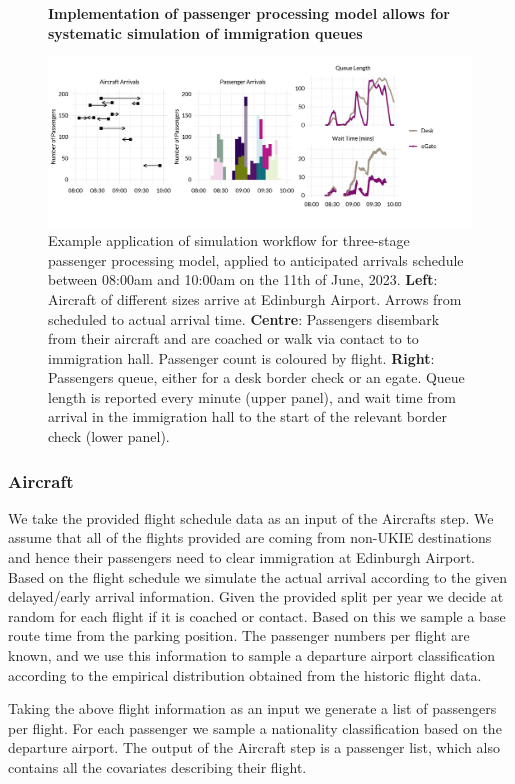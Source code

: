 \documentclass[10pt]{article}
\newcommand*{\figuretitle}[1]{%
    {\centering%
    \textbf{#1}%
    \par\medskip}%
}
\begin{document}
\begin{figure}[!ht]
    \centering
    \figuretitle{Implementation of passenger processing model allows for systematic simulation of immigration queues}
    \includegraphics[width=1.1\textwidth]{figures/workflow_fig.png}
     \caption{Example application of simulation workflow for three-stage passenger processing model, applied to anticipated arrivals schedule between 08:00am and 10:00am on the 11th of June, 2023. \textbf{Left}: Aircraft of different sizes arrive at Edinburgh Airport. Arrows from scheduled to actual arrival time. \textbf{Centre}: Passengers disembark from their aircraft and are coached or walk via contact to to immigration hall. Passenger count is coloured by flight. \textbf{Right}: Passengers queue, either for a desk border check or an \gls{egate}. Queue length is reported every minute (upper panel), and wait time from arrival in the immigration hall to the start of the relevant border check (lower panel).} \label{fig:workflow_fig}
\end{figure}


\subsubsection{Aircraft}
We take the provided flight schedule data as an input of the Aircrafts step. We assume that all of the flights provided are coming from non-UKIE destinations and hence their passengers need to clear immigration at Edinburgh Airport. Based on the flight schedule we simulate the actual arrival according to the given delayed/early arrival information. Given the provided split per year we decide at random for each flight if it is coached or contact. Based on this we sample a base route time from the parking position. The passenger numbers per flight are known, and we use this information to sample a departure airport classification according to the empirical distribution obtained from the historic flight data.

Taking the above flight information as an input we generate a list of passengers per flight. For each passenger we sample a nationality classification based on the departure airport. The output of the Aircraft step is a passenger list, which also contains all the covariates describing their flight.
\end{document}
